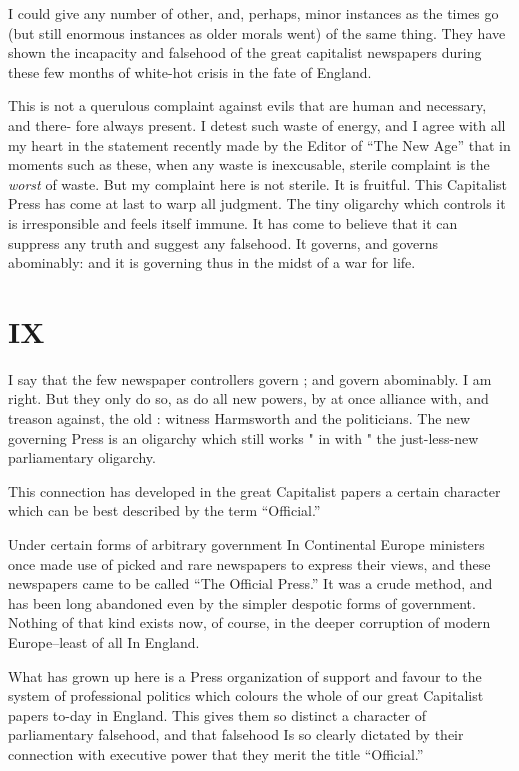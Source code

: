 \documentclass{book}
\begin{document}
I could give any number of other, and, perhaps, minor instances as the times go (but still enormous instances as older morals went) of the same thing. They have shown the incapacity and falsehood of the great capitalist newspapers during these few months of white-hot crisis in the fate of England.

This is not a querulous complaint against evils that are human and necessary, and there- fore always present. I detest such waste of energy, and I agree with all my heart in the statement recently made by the Editor of “The New Age” that in moments such as these, when any waste is inexcusable, sterile complaint is the \emph{worst} of waste. But my complaint here is not sterile. It is fruitful. This Capitalist Press has come at last to warp all judgment. The tiny oligarchy which controls it is irresponsible and feels itself immune. It has come to believe that it can suppress any truth and suggest any falsehood. It governs, and governs abominably: and it is governing thus in the midst of a war for life.

\chapter*{IX}
\label{chapter-10}
I say that the few newspaper controllers govern ; and govern abominably. I am right. But they only do so, as do all new powers, by at once alliance with, and treason against, the old : witness Harmsworth and the politicians. The new governing Press is an oligarchy which still works " in with " the just-less-new parliamentary oligarchy.

This connection has developed in the great Capitalist papers a certain character which can be best described by the term “Official.”

Under certain forms of arbitrary government In Continental Europe ministers once made use of picked and rare newspapers to express their views, and these newspapers came to be called “The Official Press.” It was a crude method, and has been long abandoned even by the simpler despotic forms of government. Nothing of that kind exists now, of course, in the deeper corruption of modern Europe–least of all In England.

What has grown up here is a Press organization of support and favour to the system of professional politics which colours the whole of our great Capitalist papers to-day in England. This gives them so distinct a character of parliamentary falsehood, and that falsehood Is so clearly dictated by their connection with executive power that they merit the title “Official.”
\end{document}
